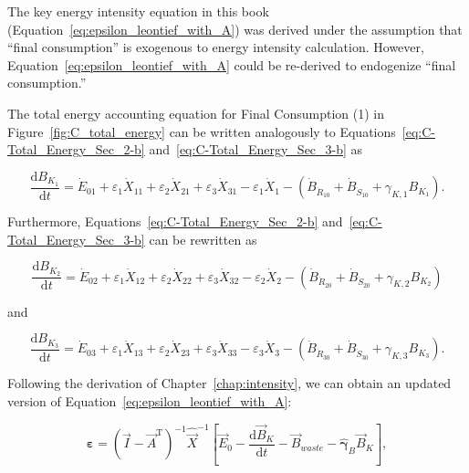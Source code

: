 The key energy intensity equation in this book
(Equation~\ref{eq:epsilon_leontief_with_A})
was derived under the assumption that ``final consumption''
is exogenous to energy intensity calculation.
However, Equation~\ref{eq:epsilon_leontief_with_A}
could be re-derived to endogenize 
``final consumption.''

The total energy accounting equation for Final Consumption (1)
in Figure~\ref{fig:C_total_energy} can be written 
analogously to Equations~\ref{eq:C-Total_Energy_Sec_2-b}
and~\ref{eq:C-Total_Energy_Sec_3-b} as

\begin{equation} \label{eq:C-Total_Energy_Sec_1-unfinished}
	\frac{\mathrm{d}B_{K_{1}}}{\mathrm{d}t}
	= \dot{E}_{01}
	+ \varepsilon_{1} \dot{X}_{11}
	+ \varepsilon_{2} \dot{X}_{21}
	+ \varepsilon_{3} \dot{X}_{31}
	- \varepsilon_{1} \dot{X}_{1}
	- \left( \dot{B}_{\dot{R}_{10}} 
							+ \dot{B}_{\dot{S}_{10}}
							+ \gamma_{K,1} B_{K_{1}}
							\right).
\end{equation}

\noindent{}Furthermore, Equations~\ref{eq:C-Total_Energy_Sec_2-b}
and~\ref{eq:C-Total_Energy_Sec_3-b}
can be rewritten as 

\begin{equation} \label{eq:C-Total_Energy_Sec_2-unfinished}
	\frac{\mathrm{d}B_{K_{2}}}{\mathrm{d}t}
	= \dot{E}_{02}
	+ \varepsilon_{1} \dot{X}_{12}
	+ \varepsilon_{2} \dot{X}_{22}
	+ \varepsilon_{3} \dot{X}_{32}
	- \varepsilon_{2} \dot{X}_{2}
	- \left( \dot{B}_{\dot{R}_{20}} 
							+ \dot{B}_{\dot{S}_{20}}
							+ \gamma_{K,2} B_{K_{2}}
							\right)
\end{equation}

\noindent{}and

\begin{equation} \label{eq:C-Total_Energy_Sec_3-unfinished}
	\frac{\mathrm{d}B_{K_{3}}}{\mathrm{d}t}
	= \dot{E}_{03}
	+ \varepsilon_{1} \dot{X}_{13}
	+ \varepsilon_{2} \dot{X}_{23}
	+ \varepsilon_{3} \dot{X}_{33}
	- \varepsilon_{3} \dot{X}_{3}
	- \left( \dot{B}_{\dot{R}_{30}} 
							+ \dot{B}_{\dot{S}_{30}}
							+ \gamma_{K,3} B_{K_{3}}
							\right).
\end{equation}

\noindent{}Following the derivation of Chapter~\ref{chap:intensity},
we can obtain an updated version 
of Equation~\ref{eq:epsilon_leontief_with_A}:

\begin{equation} \label{eq:epsilon_leontief_depreciation_simplification_demand_endogenized}
	\boldsymbol{\varepsilon} 
	= {(\vec{I} - \vec{A}^{\mathrm{T}})}^{-1}\hat{\vec{X}}^{-1}
		\left[\vec{E}_{0} 
				- \frac{\mathrm{d}\vec{B}_{K}}{\mathrm{d}t} 
				- \vec{B}_{waste}
				- \hat{\boldsymbol{\gamma}}_{B}\vec{B}_{K}
		\right],
\end{equation}

